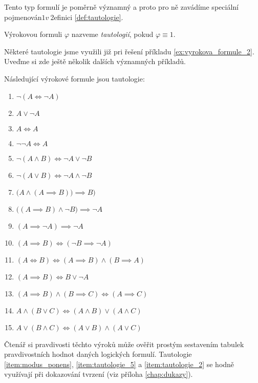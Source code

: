 Tento typ formulí je poměrně významný a proto pro ně zavádíme speciální pojmenován$1 v~$2efinici \ref{def:tautologie}.
\begin{definition}[Tautologie]\label{def:tautologie}
    Výrokovou formuli $\varphi$ nazveme \emph{tautologií}, pokud $\varphi\equiv 1$.
\end{definition}

Některé tautologie jsme využili již pri řešení příkladu \ref{ex:vyrokova_formule_2}. Uveďme si zde ještě několik dalších významných příkladů.
\begin{theorem}\label{thm:vyznamne_tautologie}
    Následující výrokové formule jsou tautologie:
    \begin{enumerate}[label=(\roman*)]
        \item\label{item:tautologie_1} $\neg (A \iff \neg A)$
        \item\label{item:zakon_vylouceneho_tretiho} $A \lor \neg A$ 
        \item\label{item:zakon_identity} $A \iff A$ 
        \item\label{item:zakon_dvoji_negace} $\neg\neg A \iff A$ 
        \item\label{item:de_morgan_1} $\neg (A \land B) \iff \neg A \lor \neg B$ 
        \item\label{item:de_morgan_2} $\neg (A \lor B) \iff \neg A \land \neg B$ 
        \item\label{item:modus_ponens} $\bigl(A \land (A \implies B)\bigr) \implies B)$ 
        \item\label{item:modus_tollens_1} $\bigl((A \implies B) \land \neg B\bigr) \implies \neg A$ 
        \item\label{item:reductio_ad_absurdum} $(A \implies \neg A) \implies \neg A$
        \item\label{item:tautologie_5} $(A \implies B) \iff (\neg B \implies \neg A)$
        \item\label{item:tautologie_2} $(A \iff B) \iff (A \implies B) \land (B \implies A)$
        \item\label{item:tautologie_3} $(A \implies B) \iff B \lor \neg A$
        \item\label{item:tautologie_4} $(A \implies B) \land (B \implies C) \iff (A \implies C)$
        \item\label{item:tautologie_6} $A \land (B \lor C) \iff (A \land B) \lor (A \land C)$
        \item\label{item:tautologie_7} $A \lor (B \land C) \iff (A \lor B) \land (A \lor C)$
    \end{enumerate}
\end{theorem}

Čtenář si pravdivosti těchto výroků může ověřit prostým sestavením tabulek pravdivostních hodnot daných logických formulí. Tautologie \ref{item:modus_ponens}, \ref{item:tautologie_5} a \ref{item:tautologie_2} se hodně využívají při dokazování tvrzení (viz příloha \ref{chap:dukazy}).